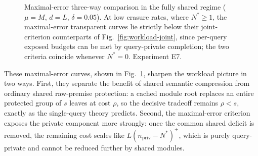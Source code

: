 \documentclass[journal]{IEEEtran}
\numberwithin{equation}{section}
\begin{document}
\begin{figure}[t]
\centering
{}
\caption{Maximal-error three-way comparison in the fully shared regime
(\(\mu=M\), \(d=L\), \(\delta=0.05\)).  At low erasure rates, where
\(N^{*}\ge1\), the maximal-error transparent curves lie strictly below their
joint-criterion counterparts of Fig.~\ref{fig:workload-joint}, since
per-query exposed budgets can be met by query-private completion; the two
criteria coincide whenever \(N^{*}=0\).  Experiment E7.}
\label{fig:workload-max}
\end{figure}

These maximal-error curves, shown in Fig.~\ref{fig:workload-max},
sharpen the workload picture in two ways.
First, they separate the benefit of shared semantic compression from
ordinary shared raw-premise protection: a cached module root replaces an
entire protected group of \(s\) leaves at cost \(\rho\), so the decisive
tradeoff remains \(\rho<s\), exactly as the single-query theory predicts.
Second, the maximal-error criterion exposes the private component more
strongly: once the common shared deficit is removed, the remaining cost
scales like \(L(n_{\mathrm{priv}}-N^{*})^{+}\), which is purely
query-private and cannot be reduced further by shared modules.
\end{document}
